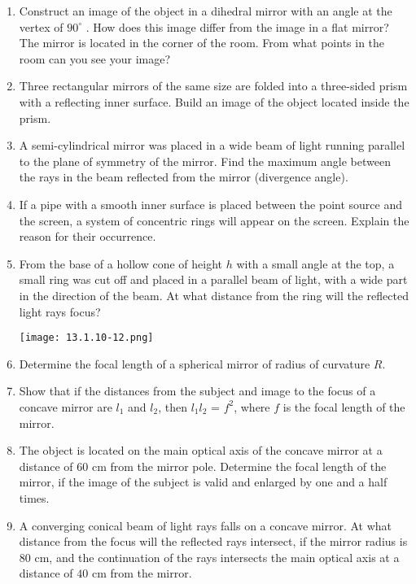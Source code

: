 \documentclass{article}
\begin{document}
\begin{enumerate}[label=13.1.\arabic*]
\item Construct an image of the object in a dihedral mirror with an angle at the vertex of $90^\circ$ . How does this image differ from the image in a flat mirror? The mirror is located in the corner of the room. From what points in the room can you see your image?

\item Three rectangular mirrors of the same size are folded into a three-sided prism with a reflecting inner surface. Build an image of the object located inside the prism.

\item A semi-cylindrical mirror was placed in a wide beam of light running parallel to the plane of symmetry of the mirror. Find the maximum angle between the rays in the beam reflected from the mirror (divergence angle).

\item If a pipe with a smooth inner surface is placed between the point source and the screen, a system of concentric rings will appear on the screen. Explain the reason for their occurrence.

\item From the base of a hollow cone of height $h$ with a small angle at the top, a small ring was cut off and placed in a parallel beam of light, with a wide part in the direction of the beam. At what distance from the ring will the reflected light rays focus?

\begin{center}
    \texttt{[image: 13.1.10-12.png]}
\end{center}


\item Determine the focal length of a spherical mirror of radius of curvature $R$.

\item Show that if the distances from the subject and image to the focus of a concave mirror are $l_1$ and $l_2$, then $l_1l_2$ = $f^2$, where $f$ is the focal length of the mirror.

\item The object is located on the main optical axis of the concave mirror at a distance of $60$ cm from the mirror pole. Determine the focal length of the mirror, if the image of the subject is valid and enlarged by one and a half times.

\item A converging conical beam of light rays falls on a concave mirror. At what distance from the focus will the reflected rays intersect, if the mirror radius is $80$ cm, and the continuation of the rays intersects the main optical axis at a distance of $40$ cm from the mirror.


\end{enumerate}
\end{document}
